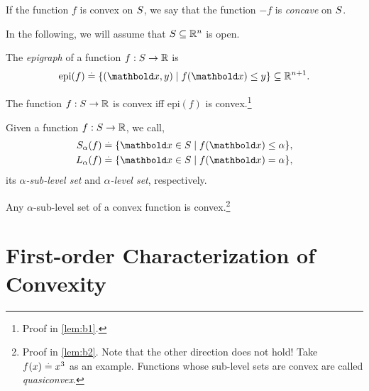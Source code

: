 \begin{rmk}
If the function $f$ is convex on $S$, we say that the function $-f$ is \emph{concave} on $S$.
\end{rmk}

In the following, we will assume that $S \subseteq \mathbb{R}^n$ is open.

\begin{defn}[Epigraph]
The \emph{epigraph} of a function $f : S \to \mathbb{R}$ is \begin{align}
    \mathrm{epi}(f) \defeq \{(\vx,y) \mid f(\vx) \leq y\} \subseteq \R^{n+1}.
\end{align}
\end{defn}
\begin{lem}
The function $f : S \to \mathbb{R}$ is convex iff $\mathrm{epi}(f)$ is convex.\footnote{Proof in \cref{lem:b1}.}
\end{lem}

\begin{defn} Given a function $f : S \to \mathbb{R}$, we call, \begin{align}
    \sS_\alpha(f) &\defeq \{\vx \in \sS \mid f(\vx) \leq \alpha\}, \\
    \sL_\alpha(f) &\defeq \{\vx \in \sS \mid f(\vx) = \alpha\},
\end{align} its \emph{$\alpha$-sub-level set} and \emph{$\alpha$-level set}, respectively.
\end{defn}
\begin{lem}
Any $\alpha$-sub-level set of a convex function is convex.\footnote{Proof in \cref{lem:b2}. Note that the other direction does not hold! Take $f(x) \overset{.}{=} x^3$ as an example. Functions whose sub-level sets are convex are called \emph{quasiconvex}.}
\end{lem}

\section{First-order Characterization of Convexity}

